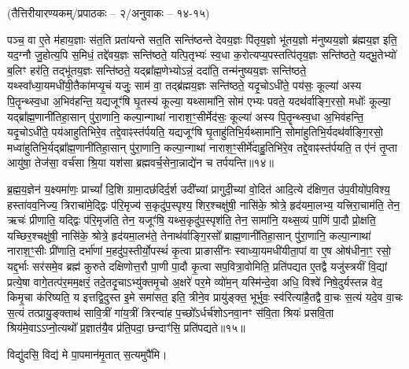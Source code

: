 \vspace{-1ex}
\centerline{\normalsize(तैत्तिरीयारण्यकम्/प्रपाठकः – २/अनुवाकः – १४-१५)}
{\normalsize
पञ्च॒ वा ए॒ते म॑हाय॒ज्ञाः स॑त॒ति प्रता॑यन्ते सत॒ति सन्ति॑ष्ठन्ते देवय॒ज्ञः पि॑तृय॒ज्ञो भू॑तय॒ज्ञो म॑नुष्यय॒ज्ञो ब्र॑ह्मय॒ज्ञ इति॒ यद॒ग्नौ जु॒होत्य॒पि स॒मिधं॒ तद्दे॑वय॒ज्ञः सन्ति॑ष्ठते॒ यत्पि॒तृभ्यः॑ स्व॒धा क॒रोत्यप्य॒पस्तत्पि॑तृय॒ज्ञः सन्ति॑ष्ठते॒ यद्भू॒तेभ्यो॑ ब॒लिꣳ हर॑ति॒ तद्भू॑तय॒ज्ञः सन्ति॑ष्ठते॒ यद्ब्रा᳚ह्म॒णेभ्योऽन्नं॒ ददा॑ति॒ तन्म॑नुष्यय॒ज्ञः सन्ति॑ष्ठते॒ यथ्स्वा᳚ध्या॒यमधी॑यी॒तैका॑मप्यृ॒चं यजुः॒ साम॑ वा॒ तद्ब्र॑ह्मय॒ज्ञः सन्ति॑ष्ठते॒ यदृ॒चोऽधी॑ते॒ पय॑सः॒ कूल्या॑ अस्य पि॒तॄन्थ्स्व॒धा अ॒भिव॑हन्ति॒ यद्यजूꣳ॑षि घृ॒तस्य॑ कूल्या॒ यथ्सामा॑नि॒ सोम॑ एभ्यः पवते॒ यदथ॑र्वाङ्गि॒रसो॒ मधोः᳚ कूल्या॒ यद्ब्रा᳚ह्म॒णानी॑तिहा॒सान् पु॑रा॒णानि॒ कल्पा॒न्गाथा॑ नाराश॒ꣳ॒सीर्मेद॑सः॒ कूल्या॑ अस्य पि॒तॄन्थ्स्व॒धा अ॒भिव॑हन्ति॒ यदृ॒चोऽधी॑ते॒ पय॑आहुतिभिरे॒व तद्दे॒वाꣴस्त॑र्पयति॒ यद्यजूꣳ॑षि घृ॒ताहु॑तिभि॒र्यथ्सामा॑नि॒ सोमा॑हुतिभि॒र्यदथ॑र्वाङ्गि॒रसो॒ मध्वा॑\-हुतिभि॒र्यद्ब्रा᳚ह्म॒णानी॑तिहा॒सान् पु॑रा॒णानि॒ कल्पा॒न्गाथा॑ नाराश॒ꣳ॒सीर्मे॑दाहु॒तिभि॑रे॒व तद्दे॒वाꣴस्त॑र्पयति॒ त ए॑नं तृ॒प्ता आयु॑षा॒ तेज॑सा॒ वर्च॑सा श्रि॒या यश॑सा ब्रह्मवर्च॒सेना॒न्नाद्ये॑न च तर्पयन्ति॥१४॥

ब्र॒ह्म॒य॒ज्ञेन॑ य॒क्ष्यमा॑णः॒ प्राच्यां᳚ दि॒शि ग्रामा॒दछ॑दिर्द॒र्\mbox{}श उदी᳚च्यां प्रागुदी॒च्यां वो॒दित॑ आदि॒त्ये द॑क्षिण॒त उ॑प॒वीयो॑प॒विश्य॒ हस्ता॑वव॒निज्य॒ त्रिराचा॑मे॒द्द्विः प॑रि॒मृज्य॑ स॒कृदु॑प॒स्पृश्य॒ शिर॒श्चक्षु॑षी॒ नासि॑के॒ श्रोत्रे॒ हृद॑यमा॒लभ्य॒ यत्त्रिरा॒चाम॑ति॒ तेन॒ ऋचः॑ प्रीणाति॒ यद्द्विः प॑रि॒मृज॑ति॒ तेन॒ यजूꣳ॑षि॒ यथ्स॒कृदु॑प॒स्पृश॑ति॒ तेन॒ सामा॑नि॒ यथ्स॒व्यं पा॒णिं पा॒दौ प्रो॒क्षति॒ यच्छिर॒श्चक्षु॑षी॒ नासि॑के॒ श्रोत्रे॒ हृद॑यमा॒लभ॑ते॒ तेनाथ॑र्वाङ्गि॒रसो᳚ ब्राह्म॒णानी॑तिहा॒सान् पु॑रा॒णानि॒ कल्पा॒न्गाथा॑ नाराश॒ꣳ॒सीः प्री॑णाति॒ दर्भा॑णां म॒हदु॑प॒स्तीर्यो॒पस्थं॑ कृ॒त्वा प्राङासी॑नः स्वाध्या॒यमधी॑यीता॒पां वा ए॒ष ओष॑धीना॒ꣳ॒ रसो॒ यद्द॒र्भाः सर॑समे॒व ब्रह्म॑ कुरुते दक्षिणोत्त॒रौ पा॒णी पा॒दौ कृ॒त्वा सप॒वित्रा॒वोमिति॒ प्रति॑पद्यत ए॒तद्वै यजु॑स्त्रयीं वि॒द्यां प्रत्ये॒षा वागे॒तत्प॑र॒मम॒क्षरं॒ तदे॒तदृ॒चाऽभ्यु॑क्तमृ॒चो अ॒क्षरे॑ पर॒मे व्यो॑म॒न् यस्मि॑न्दे॒वा अधि॒ विश्वे॑ निषे॒दुर्यस्तन्न वेद॒ किमृ॒चा क॑रिष्यति॒ य इत्तद्वि॒दुस्त इ॒मे समा॑सत॒ इति॒ त्रीने॒व प्रायु॑ङ्क्त॒ भूर्भुवः॒ स्व॑रित्या॑है॒तद्वै वा॒चः स॒त्यं यदे॒व वा॒चः स॒त्यं तत्प्रायु॒ङ्क्ताथ॑ सावि॒त्रीं गा॑य॒त्रीं त्रिरन्वा॑ह प॒च्छो᳚ऽर्धर्च॑शोऽनवा॒नꣳ स॑वि॒ता श्रियः॑ प्रसवि॒ता श्रिय॑मे॒वाऽऽप्नो॒त्यथो᳚ प्र॒ज्ञात॑यै॒व प्र॑ति॒पदा॒ छन्दाꣳ॑सि॒ प्रति॑पद्यते॥१५॥


}

विद्यु॑दसि॒ विद्य॑ मे पा॒पमान॑मृ॒तात् स॒त्यमुपै॑मि।

